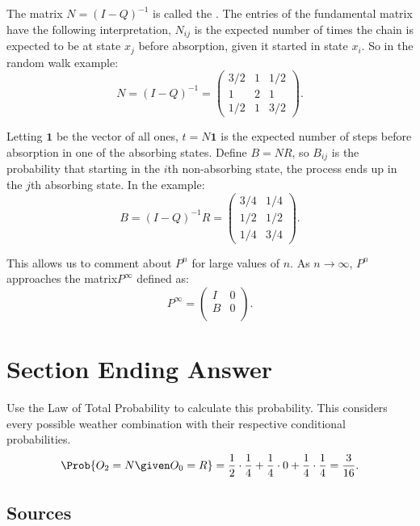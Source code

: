 \documentclass[12pt]{article}
\begin{document}
The matrix \( N=(I-Q)^{-1} \) is called the .%
The entries of the fundamental matrix have the following interpretation,
\( N_{ij} \) is the expected number of times the chain is expected to be
at state \( x_j \) before absorption, given it started in state \( x_i \).
So in the random walk example:
\[
    N = (I-Q)^{-1} =
    \begin{pmatrix}
        3/2 & 1 & 1/2 \\
        1 & 2 & 1\\
        1/2 & 1 & 3/2
    \end{pmatrix}
    .
\]

Letting \( \mathbf{1} \) be the vector of all ones, \( t=N\mathbf {1} \)
is the expected number of steps before absorption in one of the
absorbing states.  Define \( B=NR \), so \( B_{ij} \) is the probability
that starting in the \( i \)th non-absorbing state, the process ends up
in the \( j \)th absorbing state.  In the example:
\[
    B = (I-Q)^{-1}R =
    \begin{pmatrix}
        3/4 & 1/4 \\
        1/2 & 1/2 \\
        1/4 & 3/4
    \end{pmatrix}
    .
\]

This allows us to comment about \( P^n \) for large values of \( n \).
As \( n\to\infty \), \( P^n \) approaches the matrix\( P^\infty \)
defined as:
\[
    P^\infty =
    \begin{pmatrix}
        I & 0 \\
        B & 0 \\
    \end{pmatrix}
    .
\]

\hr

\section*{Section Ending Answer} Use the Law of Total Probability to
calculate this probability.  This considers every possible weather
combination with their respective conditional probabilities.
\[
    \Prob{O_2 = N \given O_0 = R} = \frac{1}{2} \cdot \frac{1}{4} +
    \frac{1}{4} \cdot 0 + \frac{1}{4} \cdot \frac{1}{4} = \frac{3}{16}.
\]

\subsection*{Sources}
\end{document}
